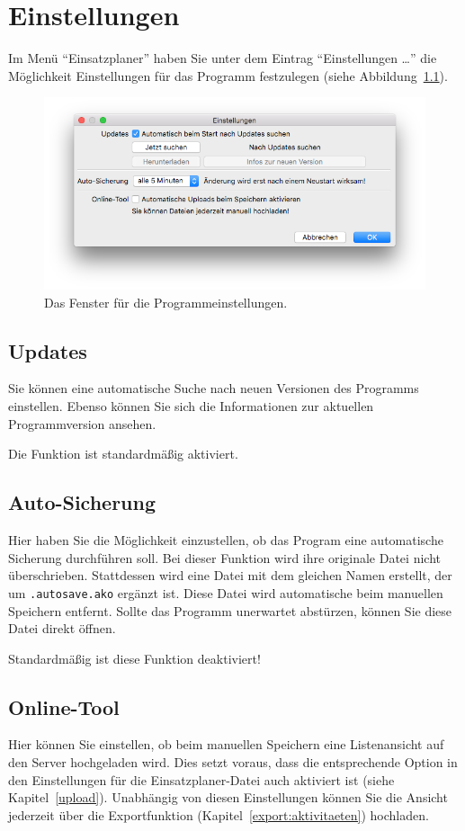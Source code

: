\chapter{Einstellungen}\label{einstellungen}
Im Menü "`Einsatzplaner"' haben Sie unter dem Eintrag "`Einstellungen \dots"' die Möglichkeit Einstellungen für das Programm festzulegen (siehe Abbildung~\ref{fig:einstellungen}).
\begin{figure}[!h]
	\includegraphics[width=\textwidth]{img/einstellungen}
	\caption{Das Fenster für die Programmeinstellungen.}
	\label{fig:einstellungen}
\end{figure}



\section{Updates}
Sie können eine automatische Suche nach neuen Versionen des Programms einstellen.
Ebenso können Sie sich die Informationen zur aktuellen Programmversion ansehen.

Die Funktion ist standardmäßig aktiviert.



\section{Auto-Sicherung}
Hier haben Sie die Möglichkeit einzustellen, ob das Program eine automatische Sicherung durchführen soll.
Bei dieser Funktion wird ihre originale Datei nicht überschrieben.
Stattdessen wird eine Datei mit dem gleichen Namen erstellt, der um \texttt{.autosave.ako} ergänzt ist.
Diese Datei wird automatische beim manuellen Speichern entfernt.
Sollte das Programm unerwartet abstürzen, können Sie diese Datei direkt öffnen.

Standardmäßig ist diese Funktion deaktiviert!



\section{Online-Tool}
Hier können Sie einstellen, ob beim manuellen Speichern eine Listenansicht auf den Server hochgeladen wird.
Dies setzt voraus, dass die entsprechende Option in den Einstellungen für die Einsatzplaner-Datei auch aktiviert ist
(siehe Kapitel~\ref{upload}).
Unabhängig von diesen Einstellungen können Sie die Ansicht jederzeit über die Exportfunktion (Kapitel~\ref{export:aktivitaeten}) hochladen.
